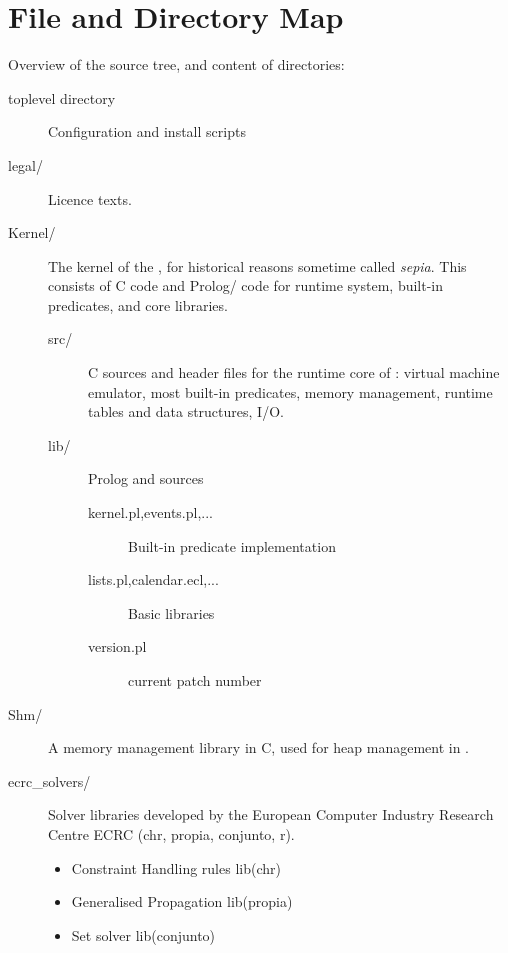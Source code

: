 \documentclass[11pt,a4paper]{book}
\begin{document}
\chapter{File and Directory Map}
Overview of the source tree, and content of directories:
\begin{description}
\item[toplevel directory] Configuration and install scripts
\item[legal/] Licence texts.

\item[Kernel/] The kernel of the {\eclipse}, for historical reasons sometime
	called {\em sepia}.
	This consists of C code and Prolog/{\eclipse} code for runtime
	system, built-in predicates, and core libraries.
    \begin{description}
    \item[src/] C sources and header files for the runtime
    	core of {\eclipse}: virtual machine emulator, most built-in predicates,
	memory management, runtime tables and data structures, I/O.
    \item[lib/] Prolog and {\eclipse} sources
	\begin{description}
	\item[kernel.pl,events.pl,...] Built-in predicate implementation
	\item[lists.pl,calendar.ecl,...] Basic libraries
	\item[version.pl] current patch number
	\end{description}
    \end{description}

\item[Shm/] A memory management library in C, used for heap management in
	{\eclipse}.

\item[ecrc_solvers/] Solver libraries developed by the European Computer
	Industry Research Centre ECRC (chr, propia, conjunto, r).
    \begin{itemize}
    \item Constraint Handling rules lib(chr)
    \item Generalised Propagation lib(propia)
    \item Set solver lib(conjunto)
    \end{itemize}


\end{description}
\end{document}
